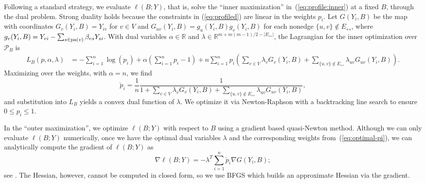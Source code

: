 \documentclass[notitlepage]{article}
\newcommand{\pa}{{\rm pa}}       %
\begin{document}
Following a standard strategy,
we evaluate $\ell(B; Y)$, that is, solve the ``inner maximization''
in~(\ref{eq:profile:inner}) at a fixed $B$, through the dual problem.
Strong duality holds because the constraints in (\ref{eq:profiled})
are linear in the weights $p_i$.  Let $G(Y_i,B)$ be the map with
coordinates $G_v(Y_i,B)=Y_{iv}$ for $v\in V$ and
$G_{uv}(Y_i,B)=g_u(Y_i,B)g_v(Y_i,B)$ for each nonedge
$\{u,v\} \notin E_\leftrightarrow$, where
$g_v(Y_i,B)=Y_{vi} - \sum_{s \in \pa(v)}\beta_{vs}Y_{si}$.  With dual
variables $\alpha\in\mathbb{R}$ and
$\lambda\in\mathbb{R}^{m+m(m - 1)/2 - |E_\leftrightarrow|}$, the
Lagrangian for the inner optimization over $\mathcal{P}_B$ is
\begin{equation}
\begin{aligned}
L_B( p, \alpha, \lambda ) & = -\sum_{i=1}^n \log(p_i) + \alpha \left(\sum_{i=1}^n
  p_i - 1\right) + n \sum_{i=1}^n p_i\left(\sum_{v\in V}
  \lambda_{v}   G_{v}(Y_i, B) + \sum_{\{u,v\}\notin E_\leftrightarrow} \lambda_{uv} G_{uv}(Y_i, B)\right).
\end{aligned}
\end{equation}
Maximizing over the weights, with $\alpha=n$, we find
\begin{equation}
  \label{eq:optimal-pi}
  \check p_i = \frac{1}{n} \frac{1}{1 + \sum_{v\in V}
  \lambda_{v}   G_{v}(Y_i, B) +\sum_{\{u,v\}\notin E_\leftrightarrow} \lambda_{uv} G_{uv}(Y_i, B)},
\end{equation}
and substitution into $L_B$ yields a convex dual
function of $\lambda$.  We optimize it via
Newton-Raphson with a backtracking line search to ensure
$0 \leq p_i \leq 1$.

In the ``outer maximization'', we optimize $\ell(B; Y)$ with respect
to $B$ using a gradient based quasi-Newton method.  Although we can
only evaluate $\ell(B; Y)$ numerically, once we have the optimal dual
variables $\lambda$ and the corresponding weights
from~(\ref{eq:optimal-pi}), we can analytically compute the gradient
of $\ell(B; Y)$ as
\begin{equation}
\nabla \ell(B; Y) = - \lambda^T\sum_{i=1}^n \check p_i \nabla G(Y_i,
B);
\end{equation}
see \citet{chaudhuri2016constrained}.
The
Hessian, however, cannot be computed in closed form, so we use BFGS
which builds an approximate Hessian via the gradient.
\end{document}
